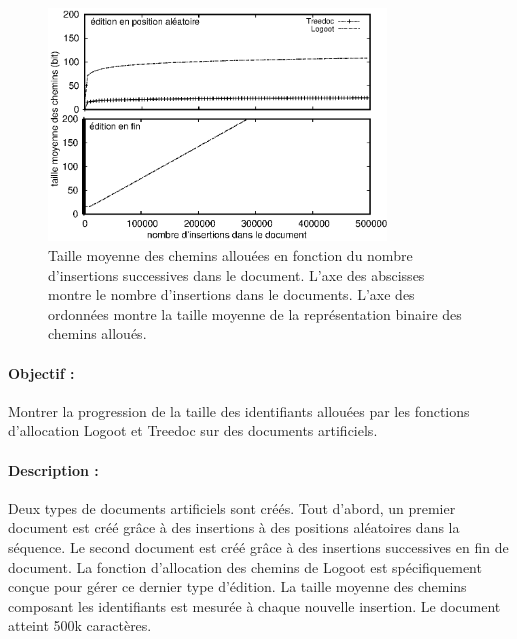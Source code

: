 \begin{figure}
  \begin{center}
    \includegraphics[width=0.8\textwidth]{img/lseq/motivationartificial.eps}
    \caption[Taille moyenne des chemins sur des documents artificiels]
    {\label{repl:img:motivationartificial}Taille moyenne des chemins
      allouées en fonction du nombre d'insertions successives dans le
      document. L'axe des abscisses montre le nombre d'insertions dans le
      documents. L'axe des ordonnées montre la taille moyenne de la
      représentation binaire des chemins alloués.}
  \end{center}
\end{figure}

\paragraph{Objectif :} Montrer la progression de la taille des identifiants
allouées par les fonctions d'allocation Logoot et Treedoc sur des documents
artificiels.

\paragraph{Description :} Deux types de documents artificiels sont créés. Tout
d'abord, un premier document est créé grâce à des insertions à des positions
aléatoires dans la séquence. Le second document est créé grâce à des insertions
successives en fin de document. La fonction d'allocation des chemins de Logoot
est spécifiquement conçue pour gérer ce dernier type d'édition. La taille
moyenne des chemins composant les identifiants est mesurée à chaque nouvelle
insertion. Le document atteint 500k caractères.

